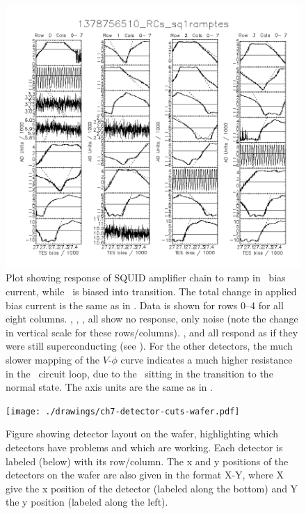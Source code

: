 \begin{figure}
\centering
\includegraphics[width=\textwidth]{./images/1378756510_RCs_sq1ramptes_00.png}
\caption[\SQUID\ response to \TES\ bias ramp (transition)]{Plot showing response of SQUID amplifier chain to ramp in \TES\ bias current, while \TES\ is biased into transition.
  The total change in applied bias current is the same as in .
  Data is shown for rows 0--4 for all eight columns.
  , , ,  all show no response, only noise (note the change in vertical scale for these rows/columns).
  ,  and  all respond as if they were still superconducting (see ).
  For the other detectors, the much slower mapping of the $V$-$\phi$ curve indicates a much higher resistance in the \TES\ circuit loop, due to the \TES\ sitting in the transition to the normal state.
  The axis units are the same as in .
}
\label{fig:tes-bias-ramp-trans}
\end{figure}

\begin{figure}
\centering
\texttt{[image: ./drawings/ch7-detector-cuts-wafer.pdf]}
\caption[Detector layout on wafer]{
Figure showing detector layout on the wafer, highlighting which detectors have problems and which are working.
Each detector is labeled (below) with its row/column.
The x and y positions of the detectors on the wafer are also given in the format X-Y, where X give the x position of the detector (labeled along the bottom) and Y the y position (labeled along the left).
}
\label{fig:detector-cuts-wafer}
\end{figure}

